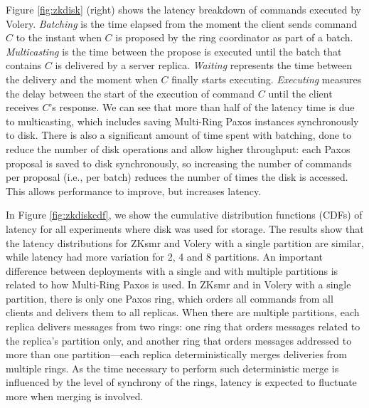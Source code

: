 Figure \ref{fig:zkdisk} (right) shows the latency breakdown of commands executed by Volery.
\emph{Batching} is the time elapsed from the moment the client sends command $C$ to the instant when $C$ is proposed by the ring coordinator as part of a batch. 
\emph{Multicasting} is the time between the propose is executed until the batch that contains $C$ is delivered by a server replica. 
\emph{Waiting} represents the time between the delivery and the moment when $C$ finally starts executing.
\emph{Executing} measures the delay between the start of the execution of command $C$ until the client receives $C$'s response.
We can see that more than half of the latency time is due to multicasting, which includes saving Multi-Ring Paxos instances synchronously to disk. 
There is also a significant amount of time spent with batching, done to reduce the number of disk operations and allow higher throughput: each Paxos proposal is saved to disk synchronously, so increasing the number of commands per proposal (i.e., per batch) reduces the number of times the disk is accessed.
This allows performance to improve, but increases latency.


In Figure \ref{fig:zkdiskcdf}, we show the cumulative distribution functions (CDFs) of latency for all experiments where disk was used for storage. 
The results show that the latency distributions for ZKsmr and Volery with a single partition are similar, while latency had more variation for 2, 4 and 8 partitions. 
An important difference between deployments with a single and with multiple partitions is related to how Multi-Ring Paxos is used. In ZKsmr and in Volery with a single partition, there is only one Paxos ring, which orders all commands from all clients and delivers them to all replicas. 
When there are multiple partitions, each replica delivers messages from two rings: one ring that orders messages related to the replica's partition only, and another ring that orders messages addressed to more than one partition---each replica deterministically merges deliveries from multiple rings. 
As the time necessary to perform such deterministic merge is influenced by the level of synchrony of the rings, latency is expected to fluctuate more when merging is involved.

